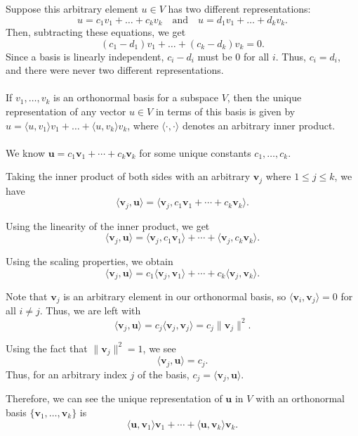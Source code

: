 \documentclass[12pt]{article}
\begin{document}
Suppose this arbitrary element \( u \in V \) has two different representations: 
\[
u = c_1v_1 + \ldots + c_kv_k \quad \text{and} \quad u = d_1v_1 + \ldots + d_kv_k.
\]
Then, subtracting these equations, we get
\[
(c_1 - d_1)v_1 + \ldots + (c_k - d_k)v_k = 0.
\]
Since a basis is linearly independent, $c_i - d_i$ must be 0 for all $i$. Thus, $c_i = d_i$, and there were never two different representations.
\\
\\
If ${v_1, \ldots, v_k}$ is an orthonormal basis for a subspace $V$, then the unique representation of any vector $u \in V$ in terms of this basis is given by $u = \langle u, v_1 \rangle v_1 + \ldots + \langle u, v_k \rangle v_k$, where $\langle \cdot, \cdot \rangle$ denotes an arbitrary inner product.\\
\\
We know \( \mathbf{u} = c_1\mathbf{v}_1 + \cdots + c_k\mathbf{v}_k \) for some unique constants \( c_1, \ldots, c_k \).

Taking the inner product of both sides with an arbitrary \( \mathbf{v}_j \) where \( 1 \leq j \leq k \), we have
\[ \langle \mathbf{v}_j, \mathbf{u} \rangle = \langle \mathbf{v}_j, c_1\mathbf{v}_1 + \cdots + c_k\mathbf{v}_k \rangle. \]

Using the linearity of the inner product, we get
\[ \langle \mathbf{v}_j, \mathbf{u} \rangle = \langle \mathbf{v}_j, c_1\mathbf{v}_1 \rangle + \cdots + \langle \mathbf{v}_j, c_k\mathbf{v}_k \rangle. \]

Using the scaling properties, we obtain
\[ \langle \mathbf{v}_j, \mathbf{u} \rangle = c_1 \langle \mathbf{v}_j, \mathbf{v}_1 \rangle + \cdots + c_k \langle \mathbf{v}_j, \mathbf{v}_k \rangle. \]

Note that \( \mathbf{v}_j \) is an arbitrary element in our orthonormal basis, so \( \langle \mathbf{v}_i, \mathbf{v}_j \rangle = 0 \) for all \( i \neq j \). Thus, we are left with
\[ \langle \mathbf{v}_j, \mathbf{u} \rangle = c_j \langle \mathbf{v}_j, \mathbf{v}_j \rangle = c_j \lVert \mathbf{v}_j \rVert^2. \]

Using the fact that \( \lVert \mathbf{v}_j \rVert^2 = 1 \), we see
\[ \langle \mathbf{v}_j, \mathbf{u} \rangle = c_j. \]
Thus, for an arbitrary index \( j \) of the basis, \( c_j = \langle \mathbf{v}_j, \mathbf{u} \rangle \).

Therefore, we can see the unique representation of \( \mathbf{u} \) in \( V \) with an orthonormal basis \( \{ \mathbf{v}_1, \ldots, \mathbf{v}_k \} \) is
\[ \langle \mathbf{u}, \mathbf{v}_1 \rangle \mathbf{v}_1 + \cdots + \langle \mathbf{u}, \mathbf{v}_k \rangle \mathbf{v}_k. \]
\end{document}
